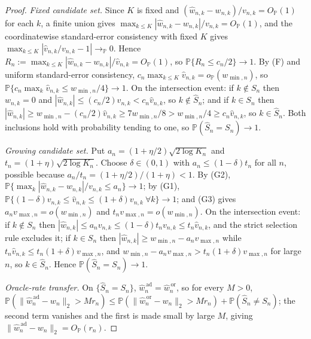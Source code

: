 \documentclass[12pt]{article}
\newcommand{\1}{\mathbf{1}}
\begin{document}
\begin{proof}
\emph{Fixed candidate set.} Since $K$ is fixed and $(\widehat w_{n,k}-w_{n,k})/v_{n,k}=O_{\mathbb P}(1)$ for
each $k$, a finite union gives $\max_{k\le K}|\widehat w_{n,k}-w_{n,k}|/v_{n,k}=O_{\mathbb P}(1)$, and
the coordinatewise standard-error consistency with fixed $K$ gives
$\max_{k\le K}|\widehat v_{n,k}/v_{n,k}-1|\to_{\mathbb P}0$. Hence
$R_n:=\max_{k\le K}|\widehat w_{n,k}-w_{n,k}|/\widehat v_{n,k}=O_{\mathbb P}(1)$, so
$\mathbb P\{R_n\le c_n/2\}\to1$. By \textup{(F)} and uniform standard-error consistency,
$c_n\max_{k\le K}\widehat v_{n,k}=o_{\mathbb P}(w_{\min,n})$, so
$\mathbb P\{c_n\max_k\widehat v_{n,k}\le w_{\min,n}/4\}\to1$. On the intersection event: if
$k\notin S_n$ then $w_{n,k}=0$ and $|\widehat w_{n,k}|\le(c_n/2)\widehat v_{n,k}<c_n\widehat v_{n,k}$,
so $k\notin\widehat S_n$; and if $k\in S_n$ then
$|\widehat w_{n,k}|\ge w_{\min,n}-(c_n/2)\widehat v_{n,k}\ge 7w_{\min,n}/8>w_{\min,n}/4\ge
c_n\widehat v_{n,k}$, so $k\in\widehat S_n$. Both inclusions hold with probability tending to one, so
$\mathbb P(\widehat S_n=S_n)\to1$.

\emph{Growing candidate set.} Put $a_n=(1+\eta/2)\sqrt{2\log K_n}$ and $t_n=(1+\eta)\sqrt{2\log K_n}$. Choose
$\delta\in(0,1)$ with $a_n\le(1-\delta)t_n$ for all $n$, possible because
$a_n/t_n=(1+\eta/2)/(1+\eta)<1$. By \textup{(G2)},
$\mathbb P\{\max_k|\widehat w_{n,k}-w_{n,k}|/v_{n,k}\le a_n\}\to1$; by \textup{(G1)},
$\mathbb P\{(1-\delta)v_{n,k}\le\widehat v_{n,k}\le(1+\delta)v_{n,k}\ \forall k\}\to1$; and
\textup{(G3)} gives $a_nv_{\max,n}=o(w_{\min,n})$ and $t_nv_{\max,n}=o(w_{\min,n})$. On the
intersection event: if $k\notin S_n$ then
$|\widehat w_{n,k}|\le a_nv_{n,k}\le(1-\delta)t_nv_{n,k}\le t_n\widehat v_{n,k}$, and the strict
selection rule excludes it; if $k\in S_n$ then
$|\widehat w_{n,k}|\ge w_{\min,n}-a_nv_{\max,n}$ while $t_n\widehat v_{n,k}\le t_n(1+\delta)v_{\max,n}$,
and $w_{\min,n}-a_nv_{\max,n}>t_n(1+\delta)v_{\max,n}$ for large $n$, so $k\in\widehat S_n$. Hence
$\mathbb P(\widehat S_n=S_n)\to1$.

\emph{Oracle-rate transfer.} On $\{\widehat S_n=S_n\}$,
$\widehat w_n^{\,\mathrm{ad}}=\widehat w_n^{\,\mathrm{or}}$, so for every $M>0$,
$\mathbb P(\|\widehat w_n^{\,\mathrm{ad}}-w_n\|_2>Mr_n)\le
\mathbb P(\|\widehat w_n^{\,\mathrm{or}}-w_n\|_2>Mr_n)+\mathbb P(\widehat S_n\neq S_n)$; the second
term vanishes and the first is made small by large $M$, giving
$\|\widehat w_n^{\,\mathrm{ad}}-w_n\|_2=O_{\mathbb P}(r_n)$.


\end{proof}
\end{document}
